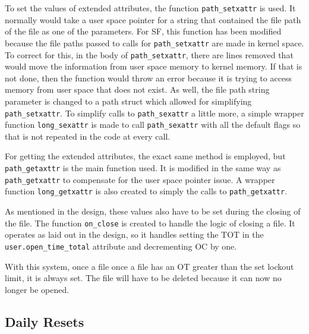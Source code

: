 To set the values of extended attributes, the function \texttt{path\_setxattr} is used. It normally would take a user space pointer for a string that contained the file path of the file as one of the parameters. For SF, this function has been modified because the file paths passed to calls for \texttt{path\_setxattr} are made in kernel space. To correct for this, in the body of \texttt{path\_setxattr}, there are lines removed that would move the information from user space memory to kernel memory. If that is not done, then the function would throw an error because it is trying to access memory from user space that does not exist. As well, the file path string parameter is changed to a path struct which allowed for simplifying \texttt{path\_setxattr}. To simplify calls to \texttt{path\_sexattr} a little more, a simple wrapper function \texttt{long\_sexattr} is made to call \texttt{path\_sexattr} with all the default flags so that is not repeated in the code at every call.

For getting the extended attributes, the exact same method is employed, but \texttt{path\_getaxttr} is the main function used. It is modified in the same way as \texttt{path\_getxattr} to compensate for the user space pointer issue. A wrapper function \texttt{long\_getxattr} is also created to simply the calls to \texttt{path\_getxattr}.

As mentioned in the design, these values also have to be set during the closing of the file. The function \texttt{on\_close} is created to handle the logic of closing a file. It operates as laid out in the design, so it handles setting the TOT in the \texttt{user.open\_time\_total} attribute and decrementing OC by one.

With this system, once a file once a file has an OT greater than the set lockout limit, it is always set. The file will have to be deleted because it can now no longer be opened.

\subsection{Daily Resets}

